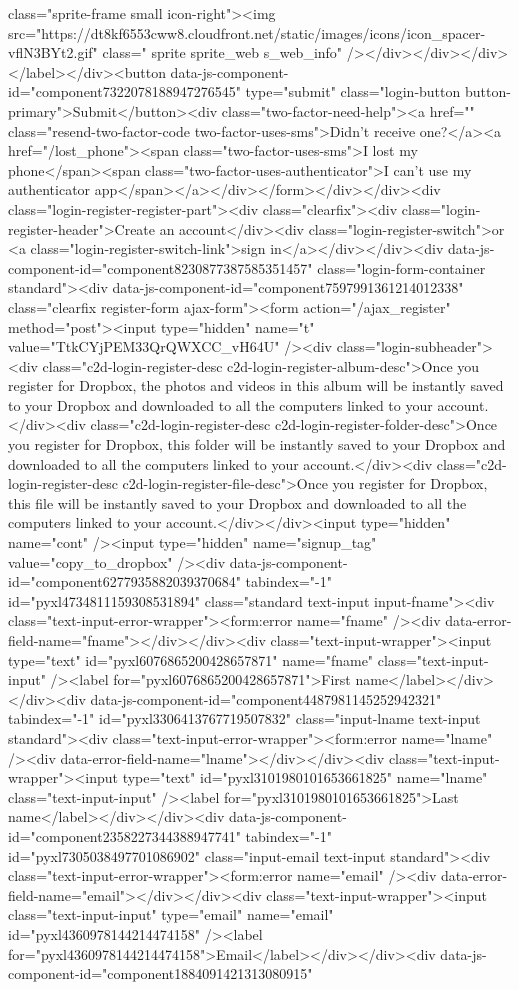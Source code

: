 {class="sprite-frame small icon-right"><img src="https://dt8kf6553cww8.cloudfront.net/static/images/icons/icon_spacer-vflN3BYt2.gif" class=" sprite sprite_web s_web_info" /></div></div></div></label></div><button data-js-component-id="component7322078188947276545" type="submit" class="login-button button-primary">Submit</button><div class="two-factor-need-help"><a href="" class="resend-two-factor-code two-factor-uses-sms">Didn't receive one?</a><a href="/lost_phone"><span class="two-factor-uses-sms">I lost my phone</span><span class="two-factor-uses-authenticator">I can't use my authenticator app</span></a></div></form></div></div><div class="login-register-register-part"><div class="clearfix"><div class="login-register-header">Create an account</div><div class="login-register-switch">or <a class="login-register-switch-link">sign in</a></div></div><div data-js-component-id="component8230877387585351457" class="login-form-container standard"><div data-js-component-id="component7597991361214012338" class="clearfix register-form ajax-form"><form action="/ajax_register" method="post"><input type="hidden" name="t" value="TtkCYjPEM33QrQWXCC_vH64U" /><div class="login-subheader"><div class="c2d-login-register-desc c2d-login-register-album-desc">Once you register for Dropbox, the photos and videos in this album will be instantly saved to your Dropbox and downloaded to all the computers linked to your account.</div><div class="c2d-login-register-desc c2d-login-register-folder-desc">Once you register for Dropbox, this folder will be instantly saved to your Dropbox and downloaded to all the computers linked to your account.</div><div class="c2d-login-register-desc c2d-login-register-file-desc">Once you register for Dropbox, this file will be instantly saved to your Dropbox and downloaded to all the computers linked to your account.</div></div><input type="hidden" name="cont" /><input type="hidden" name="signup_tag" value="copy_to_dropbox" /><div data-js-component-id="component6277935882039370684" tabindex="-1" id="pyxl4734811159308531894" class="standard text-input input-fname"><div class="text-input-error-wrapper"><form:error name="fname" /><div data-error-field-name="fname"></div></div><div class="text-input-wrapper"><input type="text" id="pyxl6076865200428657871" name="fname" class="text-input-input" /><label for="pyxl6076865200428657871">First name</label></div></div><div data-js-component-id="component4487981145252942321" tabindex="-1" id="pyxl3306413767719507832" class="input-lname text-input standard"><div class="text-input-error-wrapper"><form:error name="lname" /><div data-error-field-name="lname"></div></div><div class="text-input-wrapper"><input type="text" id="pyxl3101980101653661825" name="lname" class="text-input-input" /><label for="pyxl3101980101653661825">Last name</label></div></div><div data-js-component-id="component2358227344388947741" tabindex="-1" id="pyxl7305038497701086902" class="input-email text-input standard"><div class="text-input-error-wrapper"><form:error name="email" /><div data-error-field-name="email"></div></div><div class="text-input-wrapper"><input class="text-input-input" type="email" name="email" id="pyxl4360978144214474158" /><label for="pyxl4360978144214474158">Email</label></div></div><div data-js-component-id="component1884091421313080915" }
